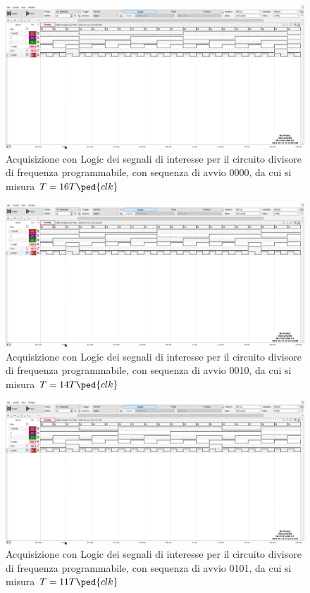 \documentclass[10pt, a4paper, italian]{article}
\begin{document}
\begin{figure}[htbp]
\centering
	\includegraphics[width=\textwidth]{5.f_0000}
	\caption{Acquisizione con Logic dei segnali di interesse per il circuito divisore di frequenza programmabile, con sequenza di avvio 0000, da cui si misura $T = 16 T\ped{clk}$
	 \label{fig: RCO_0000}}
\end{figure}
\begin{figure}[htbp]
\centering
	\includegraphics[width=\textwidth]{5.f_0010}
	\caption{Acquisizione con Logic dei segnali di interesse per il circuito divisore di frequenza programmabile, con sequenza di avvio 0010, da cui si misura $T = 14 T\ped{clk}$
	 \label{fig: RCO_0010}}
\end{figure}
\begin{figure}[htbp]
\centering
	\includegraphics[width=\textwidth]{5.f_0101}
	\caption{Acquisizione con Logic dei segnali di interesse per il circuito divisore di frequenza programmabile, con sequenza di avvio 0101, da cui si misura $T = 11 T\ped{clk}$
	 \label{fig: RCO_0101}}
\end{figure}
\end{document}

